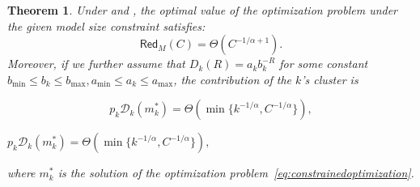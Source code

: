 \documentclass[11pt]{article}
\theoremstyle{plain}
\newtheorem{theorem}{Theorem}[section]
\theoremstyle{definition}
\newcommand{\capacity}{C}
\newcommand{\ratedistortion}{\mathcal{D}}
\newcommand{\testmodelerror}{\mathsf{Red}_M}
\newcommand{\jian}[1]{{\it \color{red}{Jian: #1}}}
\newcommand{\zhixuan}[1]{{\it \color{blue}{zhixuan: #1}}}
\begin{document}
\begin{theorem}
\label{thm:model scaling} 
 Under  and , the optimal value of the optimization problem under the given model size constraint satisfies:
\[\testmodelerror(\capacity) = \Theta(\capacity^{-1/\alpha+1}).\] 
Moreover, if we further assume that $D_k(R)=a_kb_k^{-R}$ for some constant $b_{\min}\le b_k\le b_{\max},a_{\min}\le a_k\le a_{\max}$,  
the contribution of the $k$'s cluster is
\begin{arxiv}
\[
p_k\ratedistortion_k(m_k^*)=\Theta(\min\{k^{-1/\alpha},C^{-1/\alpha}\}),
\]
\end{arxiv}
\begin{nips}
$
p_k\ratedistortion_k(m_k^*)=\Theta(\min\{k^{-1/\alpha},C^{-1/\alpha}\}),
$
\end{nips}
where $m_k^*$ is the solution of the optimization problem~\eqref{eq:constrainedoptimization}.
\end{theorem}
\end{document}
